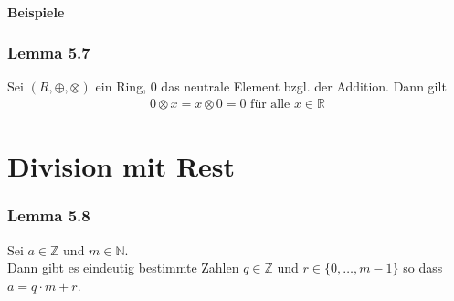 \documentclass[a5paper, 10pt]{book}
\newcommand{\inN}{\in\mathbb{N}}
\newcommand{\inZ}{\in\mathbb{Z}}
\newcommand{\inR}{\in\mathbb{R}}
\newcommand{\circleplus}{\oplus}%
\newcommand{\circlecdot}{\otimes}%
\begin{document}
			\paragraph{Beispiele}
			
			
			\subsubsection{Lemma 5.7}
				Sei $(R,\circleplus,\circlecdot)$ ein Ring, $0$ das neutrale Element bzgl. der Addition. Dann gilt
				\begin{align}
					0 \circlecdot x = x \circlecdot 0 = 0 \text{ für alle } x \inR
				\end{align}
				
		\section{Division mit Rest}
			
			\subsubsection{Lemma 5.8}
				Sei $a\inZ$ und $m\inN$.\\Dann gibt es eindeutig bestimmte Zahlen $q\inZ$ und $r\in\{0,\dots, m-1\}$ so dass $a = q\cdot m + r$.
			
\end{document}
